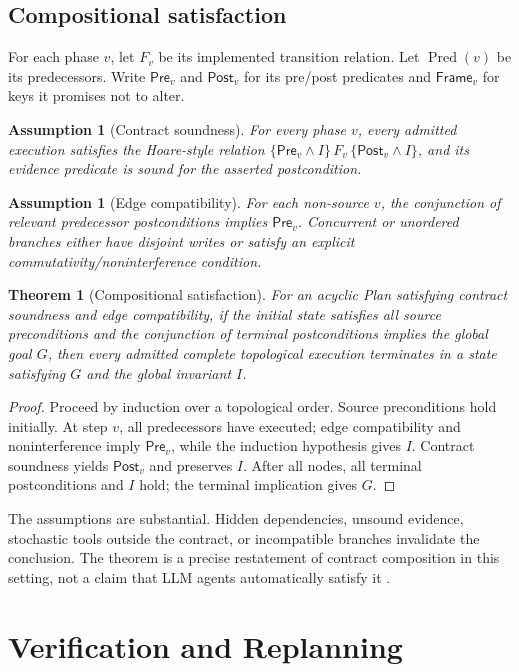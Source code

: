 \documentclass[11pt,a4paper]{article}
\newtheorem{assumption}[definition]{Assumption}
\newtheorem{theorem}[definition]{Theorem}
\begin{document}
\subsection{Compositional satisfaction}
\label{sec:composition}
For each phase $v$, let $F_v$ be its implemented transition relation. Let $\operatorname{Pred}(v)$ be its predecessors. Write $\mathsf{Pre}_v$ and $\mathsf{Post}_v$ for its pre/post predicates and $\mathsf{Frame}_v$ for keys it promises not to alter.

\begin{assumption}[Contract soundness]
For every phase $v$, every admitted execution satisfies the Hoare-style relation
$\{\mathsf{Pre}_v\land I\}\,F_v\,\{\mathsf{Post}_v\land I\}$, and its evidence predicate is sound for the asserted postcondition.
\end{assumption}
\begin{assumption}[Edge compatibility]
For each non-source $v$, the conjunction of relevant predecessor postconditions implies $\mathsf{Pre}_v$. Concurrent or unordered branches either have disjoint writes or satisfy an explicit commutativity/noninterference condition.
\end{assumption}
\begin{theorem}[Compositional satisfaction]
\label{thm:composition}
For an acyclic Plan satisfying contract soundness and edge compatibility, if the initial state satisfies all source preconditions and the conjunction of terminal postconditions implies the global goal $G$, then every admitted complete topological execution terminates in a state satisfying $G$ and the global invariant $I$.
\end{theorem}
\begin{proof}
Proceed by induction over a topological order. Source preconditions hold initially. At step $v$, all predecessors have executed; edge compatibility and noninterference imply $\mathsf{Pre}_v$, while the induction hypothesis gives $I$. Contract soundness yields $\mathsf{Post}_v$ and preserves $I$. After all nodes, all terminal postconditions and $I$ hold; the terminal implication gives $G$.
\end{proof}
The assumptions are substantial. Hidden dependencies, unsound evidence, stochastic tools outside the contract, or incompatible branches invalidate the conclusion. The theorem is a precise restatement of contract composition in this setting, not a claim that LLM agents automatically satisfy it \cite{hoare1969axiomatic}.

\section{Verification and Replanning}
\end{document}

